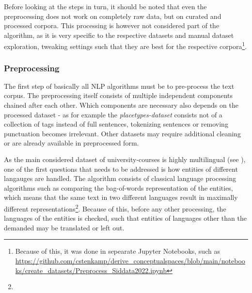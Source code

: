 

Before looking at the steps in turn, it should be noted that even the preprocessing does not work on completely raw data, but on curated and processed corpora. This processing is however not considered part of the algorithm, as it is very specific to the respective datasets and manual dataset exploration, tweaking settings such that they are best for the respective corpora\footnote{Because of this, it was done in sepearate Jupyter Notebooks, such as \url{https://github.com/cstenkamp/derive_conceptualspaces/blob/main/notebooks/create_datasets/Preprocess_Siddata2022.ipynb} }. %


\subsubsection{Preprocessing}

\label{sec:algo_preproc}

The first step of basically all NLP algorithms must be to pre-process the text corpus. The preprocessing itself consists of multiple independent components chained after each other. Which components are necessary also depends on the processed dataset - as for example the \emph{placetypes-dataset} consists not of a collection of tags instead of full sentences, tokenizing sentences or removing punctuation becomes irrelevant. Other datasets may require additional cleaning or are already available in preprocessed form.

As the main considered dataset of university-courses is highly multilingual (see ), one of the first questions that needs to be addressed is how entities of different langauges are handled. The algorithm consists of classical language processing algorithms such as comparing the bag-of-words representation of the entities, which means that the same text in two different languages result in maximally different representations\footnote{}. Because of this, before any other processing, the languages of the entities is checked, such that entities of languages other than the demanded may be translated or left out.

